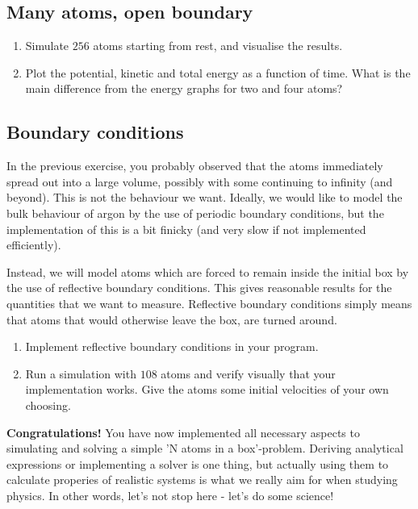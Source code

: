 \documentclass[11pt,british,a4paper]{report}
\begin{document}
\subsection{Many atoms, open boundary}
\begin{enumerate}[label=\roman*.]
    \item Simulate \(256\) atoms starting from rest, and visualise the results.
    \item Plot the potential, kinetic and total energy as a function of time. What is the main difference from the energy graphs for two and four atoms?
\end{enumerate}

\subsection{Boundary conditions}
In the previous exercise, you probably observed that the atoms immediately spread out into a large volume, possibly with some continuing to infinity (and beyond). This is not the behaviour we want. Ideally, we would like to model the bulk behaviour of argon by the use of periodic boundary conditions, but the implementation of this is a bit finicky (and very slow if not implemented efficiently).

Instead, we will model atoms which are forced to remain inside the initial box by the use of reflective boundary conditions. This gives reasonable results for the quantities that we want to measure.
Reflective boundary conditions simply means that atoms that would otherwise leave the box, are turned around.
\begin{enumerate}[label=\roman*.]
    \item Implement reflective boundary conditions in your program.
    \item Run a simulation with \(108\) atoms and verify visually that your implementation works. Give the atoms some initial velocities of your own choosing.
\end{enumerate}

\textbf{Congratulations!} You have now implemented all necessary aspects to simulating and solving a simple 'N atoms in a box'-problem. Deriving analytical expressions or implementing a solver is one thing, but actually using them to calculate properies of realistic systems is what we really aim for when studying physics. In other words, let's not stop here - let's do some science!


\end{document}
